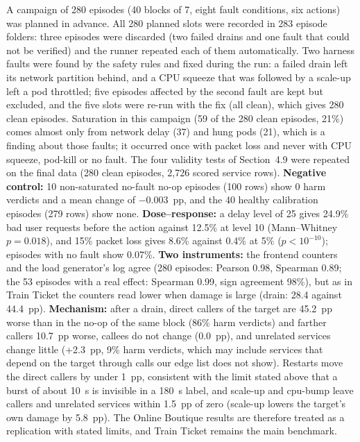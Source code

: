 A campaign of 280 episodes (40 blocks of 7, eight fault conditions, six actions) was planned in advance. All 280 planned slots were recorded in 283 episode folders: three episodes were discarded (two failed drains and one fault that could not be verified) and the runner repeated each of them automatically. Two harness faults were found by the safety rules and fixed during the run: a failed drain left its network partition behind, and a CPU squeeze that was followed by a scale-up left a pod throttled; five episodes affected by the second fault are kept but excluded, and the five slots were re-run with the fix (all clean), which gives 280 clean episodes. Saturation in this campaign (59 of the 280 clean episodes, 21\%) comes almost only from network delay (37) and hung pods (21), which is a finding about those faults; it occurred once with packet loss and never with CPU squeeze, pod-kill or no fault. The four validity tests of Section~4.9 were repeated on the final data (280 clean episodes, 2{,}726 scored service rows). \textbf{Negative control:} 10 non-saturated no-fault no-op episodes (100 rows) show 0 harm verdicts and a mean change of $-0.003$~pp, and the 40 healthy calibration episodes (279 rows) show none. \textbf{Dose--response:} a delay level of 25 gives 24.9\% bad user requests before the action against 12.5\% at level 10 (Mann--Whitney $p = 0.018$), and 15\% packet loss gives 8.6\% against 0.4\% at 5\% ($p < 10^{-10}$); episodes with no fault show 0.07\%. \textbf{Two instruments:} the frontend counters and the load generator's log agree (280 episodes: Pearson 0.98, Spearman 0.89; the 53 episodes with a real effect: Spearman 0.99, sign agreement 98\%), but as in Train Ticket the counters read lower when damage is large (drain: 28.4 against 44.4~pp). \textbf{Mechanism:} after a drain, direct callers of the target are 45.2~pp worse than in the no-op of the same block (86\% harm verdicts) and farther callers 10.7~pp worse, callees do not change (0.0~pp), and unrelated services change little (+2.3~pp, 9\% harm verdicts, which may include services that depend on the target through calls our edge list does not show). Restarts move the direct callers by under 1~pp, consistent with the limit stated above that a burst of about 10~s is invisible in a 180~s label, and scale-up and cpu-bump leave callers and unrelated services within 1.5~pp of zero (scale-up lowers the target's own damage by 5.8~pp). The Online Boutique results are therefore treated as a replication with stated limits, and Train Ticket remains the main benchmark.
